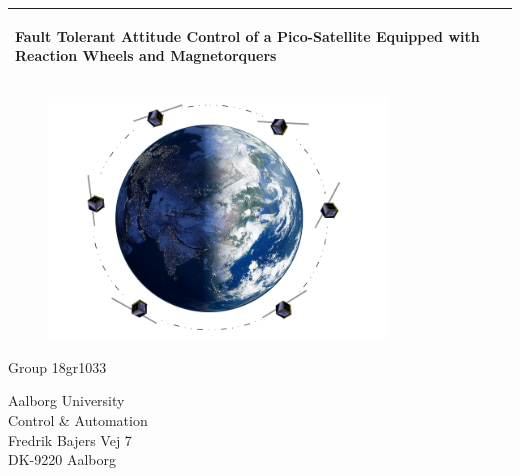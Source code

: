 %
\begin{titlepage}
  \addtolength{\hoffset}{0.5\evensidemargin-0.5\oddsidemargin} %
  \noindent%
  \begin{tabular}{@{}p{\textwidth}@{}}
    \toprule[2pt]
    \midrule
    \vspace{0.2cm}
    \begin{center}
    \Huge{\textbf{
      Fault Tolerant Attitude Control of a Pico-Satellite Equipped with Reaction Wheels
      and Magnetorquers%
    }}
    \end{center}
%
    \vspace{0.2cm}\\
    \midrule
    \toprule[2pt]
  \end{tabular}
   \vspace{0.55 cm}
  \begin{figure}[!ht]
\centering
\includegraphics[width=0.8\textwidth]{figures/c1}
\label{fig:forside}
\end{figure}
  \vspace{0.6 cm}
  \begin{center}
    \vspace{0.2cm}
    {\Large
      Group 18gr1033 %
    }
  \end{center}
  \begin{center}
  Aalborg University\\
  Control \& Automation\\
  Fredrik Bajers Vej 7\\
  DK-9220 Aalborg
  \end{center}
\end{titlepage}

\clearpage